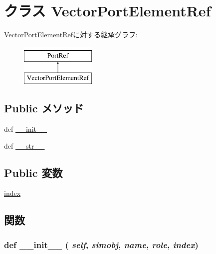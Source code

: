 \hypertarget{classm5_1_1params_1_1VectorPortElementRef}{
\section{クラス VectorPortElementRef}
\label{classm5_1_1params_1_1VectorPortElementRef}
}
VectorPortElementRefに対する継承グラフ:\begin{figure}[H]
\begin{center}
\leavevmode
\includegraphics[height=2cm]{classm5_1_1params_1_1VectorPortElementRef}
\end{center}
\end{figure}
\subsection*{Public メソッド}
\begin{DoxyCompactItemize}
\item 
def \hyperlink{classm5_1_1params_1_1VectorPortElementRef_ac775ee34451fdfa742b318538164070e}{\_\-\_\-init\_\-\_\-}
\item 
def \hyperlink{classm5_1_1params_1_1VectorPortElementRef_aa7a4b9bc0941308e362738503137460e}{\_\-\_\-str\_\-\_\-}
\end{DoxyCompactItemize}
\subsection*{Public 変数}
\begin{DoxyCompactItemize}
\item 
\hyperlink{classm5_1_1params_1_1VectorPortElementRef_a6784e1c334dfceb8f017667c0b0f6a3e}{index}
\end{DoxyCompactItemize}


\subsection{関数}
\hypertarget{classm5_1_1params_1_1VectorPortElementRef_ac775ee34451fdfa742b318538164070e}{
\subsubsection[{\_\-\_\-init\_\-\_\-}]{\setlength{\rightskip}{0pt plus 5cm}def \_\-\_\-init\_\-\_\- ( {\em self}, \/   {\em simobj}, \/   {\em name}, \/   {\em role}, \/   {\em index})}}
\label{classm5_1_1params_1_1VectorPortElementRef_ac775ee34451fdfa742b318538164070e}



